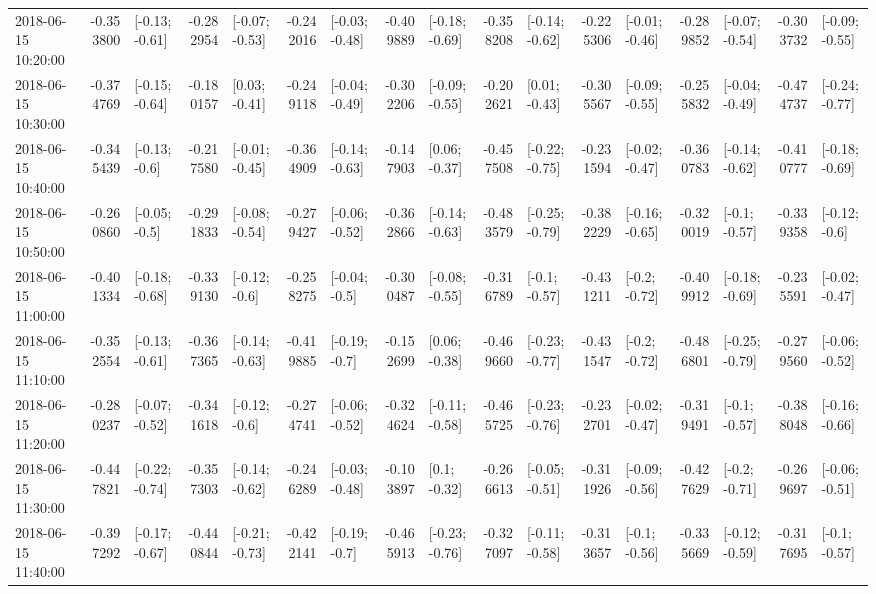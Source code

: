 \begin{tabular}{lrlrlrlrlrlrlrlrl}
2018-06-15 10:20:00 & -0.353800 &  [-0.13; -0.61] & -0.282954 &  [-0.07; -0.53] & -0.242016 &  [-0.03; -0.48] & -0.409889 &  [-0.18; -0.69] & -0.358208 &  [-0.14; -0.62] & -0.225306 &  [-0.01; -0.46] & -0.289852 &  [-0.07; -0.54] & -0.303732 &  [-0.09; -0.55] \\
2018-06-15 10:30:00 & -0.374769 &  [-0.15; -0.64] & -0.180157 &   [0.03; -0.41] & -0.249118 &  [-0.04; -0.49] & -0.302206 &  [-0.09; -0.55] & -0.202621 &   [0.01; -0.43] & -0.305567 &  [-0.09; -0.55] & -0.255832 &  [-0.04; -0.49] & -0.474737 &  [-0.24; -0.77] \\
2018-06-15 10:40:00 & -0.345439 &   [-0.13; -0.6] & -0.217580 &  [-0.01; -0.45] & -0.364909 &  [-0.14; -0.63] & -0.147903 &   [0.06; -0.37] & -0.457508 &  [-0.22; -0.75] & -0.231594 &  [-0.02; -0.47] & -0.360783 &  [-0.14; -0.62] & -0.410777 &  [-0.18; -0.69] \\
2018-06-15 10:50:00 & -0.260860 &   [-0.05; -0.5] & -0.291833 &  [-0.08; -0.54] & -0.279427 &  [-0.06; -0.52] & -0.362866 &  [-0.14; -0.63] & -0.483579 &  [-0.25; -0.79] & -0.382229 &  [-0.16; -0.65] & -0.320019 &   [-0.1; -0.57] & -0.339358 &   [-0.12; -0.6] \\
2018-06-15 11:00:00 & -0.401334 &  [-0.18; -0.68] & -0.339130 &   [-0.12; -0.6] & -0.258275 &   [-0.04; -0.5] & -0.300487 &  [-0.08; -0.55] & -0.316789 &   [-0.1; -0.57] & -0.431211 &   [-0.2; -0.72] & -0.409912 &  [-0.18; -0.69] & -0.235591 &  [-0.02; -0.47] \\
2018-06-15 11:10:00 & -0.352554 &  [-0.13; -0.61] & -0.367365 &  [-0.14; -0.63] & -0.419885 &   [-0.19; -0.7] & -0.152699 &   [0.06; -0.38] & -0.469660 &  [-0.23; -0.77] & -0.431547 &   [-0.2; -0.72] & -0.486801 &  [-0.25; -0.79] & -0.279560 &  [-0.06; -0.52] \\
2018-06-15 11:20:00 & -0.280237 &  [-0.07; -0.52] & -0.341618 &   [-0.12; -0.6] & -0.274741 &  [-0.06; -0.52] & -0.324624 &  [-0.11; -0.58] & -0.465725 &  [-0.23; -0.76] & -0.232701 &  [-0.02; -0.47] & -0.319491 &   [-0.1; -0.57] & -0.388048 &  [-0.16; -0.66] \\
2018-06-15 11:30:00 & -0.447821 &  [-0.22; -0.74] & -0.357303 &  [-0.14; -0.62] & -0.246289 &  [-0.03; -0.48] & -0.103897 &    [0.1; -0.32] & -0.266613 &  [-0.05; -0.51] & -0.311926 &  [-0.09; -0.56] & -0.427629 &   [-0.2; -0.71] & -0.269697 &  [-0.06; -0.51] \\
2018-06-15 11:40:00 & -0.397292 &  [-0.17; -0.67] & -0.440844 &  [-0.21; -0.73] & -0.422141 &   [-0.19; -0.7] & -0.465913 &  [-0.23; -0.76] & -0.327097 &  [-0.11; -0.58] & -0.313657 &   [-0.1; -0.56] & -0.335669 &  [-0.12; -0.59] & -0.317695 &   [-0.1; -0.57] \\

\end{tabular}
